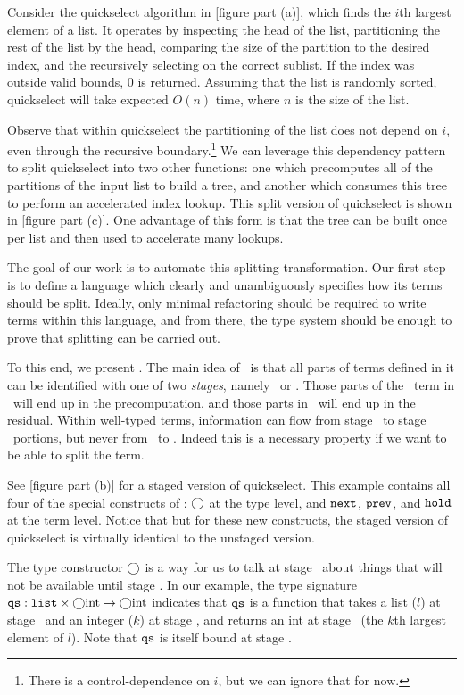 Consider the quickselect algorithm in [figure part (a)],
which finds the $i$th largest element of a list.
It operates by inspecting the head of the list, 
partitioning the rest of the list by the head,
comparing the size of the partition to the desired index,
and the recursively selecting on the correct sublist.
If the index was outside valid bounds, 0 is returned.
Assuming that the list is randomly sorted, 
quickselect will take expected $O(n)$ time, where $n$ is the size of the list.

Observe that within quickselect the partitioning of the list does not depend on $i$, 
even through the recursive boundary.\footnote{There is a control-dependence on $i$, but we can ignore that for now.}
We can leverage this dependency pattern to split quickselect into two other functions:
one which precomputes all of the partitions of the input list to build a tree,
and another which consumes this tree to perform an accelerated index lookup.
This split version of quickselect is shown in [figure part (c)].
One advantage of this form is that the tree can be built once per list
and then used to accelerate many lookups.

The goal of our work is to automate this splitting transformation.
Our first step is to define a language which clearly and unambiguously specifies how its terms should be split.
Ideally, only minimal refactoring should be required to write terms within this language,
and from there, the type system should be enough to prove that splitting can be carried out.

To this end, we present \lang.
The main idea of \lang\ is that all parts of terms defined in it can be identified with one of two {\em stages}, namely \bbone\ or \bbtwo.
Those parts of the \lang\ term in \bbone\ will end up in the precomputation, 
and those parts in \bbtwo\ will end up in the residual.
Within well-typed terms, information can flow from stage \bbone\ to stage \bbtwo\ portions,
but never from \bbtwo\ to \bbone.  
Indeed this is a necessary property if we want to be able to split the term.

See [figure part (b)] for a staged version of quickselect.
This example contains all four of the special constructs of \lang: 
$\bigcirc$ at the type level, and ${\tt next}$, ${\tt prev}$, and ${\tt hold}$ at the term level.
Notice that but for these new constructs, the staged version of quickselect is virtually identical to the unstaged version.

The type constructor $\bigcirc$ is a way for us to talk at stage \bbone\ about things that will not be available until stage \bbtwo.
In our example, the type signature ${\tt qs} : {\tt list} \times \bigcirc {\rm int} \to \bigcirc{\rm int}$ 
indicates that ${\tt qs}$ is a function that takes a list ($l$) at stage \bbone\ and an integer ($k$) at stage \bbtwo, 
and returns an int at stage \bbtwo\ (the $k$th largest element of $l$).
Note that ${\tt qs}$ is itself bound at stage \bbone.

